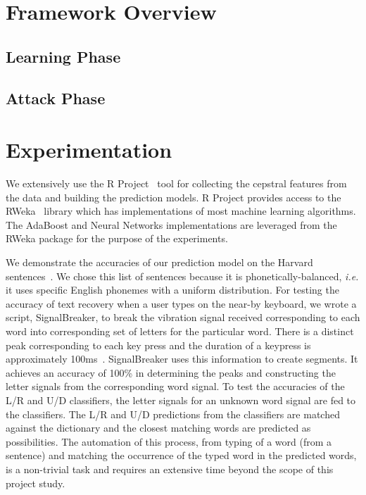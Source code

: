 \documentclass[11pt,conference]{IEEEtran}
\begin{document}
\section{Framework Overview}
\subsection{Learning Phase}
\subsection{Attack Phase}

\section{Experimentation}
\label{sec:experimentation}
\noindent We extensively use the R Project~\cite{r-project} tool for collecting the
cepstral features from the data and building the prediction models. R Project
provides access to the RWeka~\cite{rweka} library which has implementations
of most machine learning algorithms. The AdaBoost and Neural Networks implementations
are leveraged from the RWeka package for the purpose of the experiments.

We demonstrate the accuracies of our prediction model on the Harvard
sentences~\cite{harvard-sentences}. We chose this list of sentences because
it is phonetically-balanced, \emph{i.e.} it uses specific English phonemes
with a uniform distribution. For testing the accuracy of text recovery when
a user types on the near-by keyboard, we wrote a script, SignalBreaker, to break the vibration
signal received corresponding to each word into corresponding set of letters for
the particular word. There is a distinct peak corresponding to each key press and
the duration of a keypress is approximately 100ms~\cite{spiphone}. SignalBreaker
uses this information to create segments. It achieves an accuracy of 100\% in
determining the peaks and constructing the letter signals from the corresponding word
signal. To test the accuracies of the L/R and U/D classifiers, the letter signals
for an unknown word signal are fed to the classifiers. The L/R and U/D predictions
from the classifiers are matched against the dictionary and the closest matching
words are predicted as possibilities. The automation of this process, from typing
of a word (from a sentence) and matching the occurrence of the typed word in the
predicted words, is a non-trivial task and requires an extensive time beyond the scope
of this project study.
\end{document}
